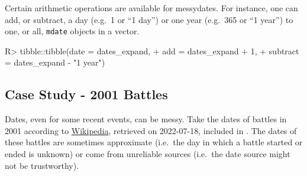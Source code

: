 \documentclass[
]{jss}
\begin{document}
Certain arithmetic operations are available for messydates. For
instance, one can add, or subtract, a day (e.g.~1 or ``1 day'') or one
year (e.g.~365 or ``1 year'') to one, or all, \texttt{mdate} objects in
a vector.

\begin{CodeChunk}
\begin{CodeInput}
R> tibble::tibble(date = dates_expand,
+                add = dates_expand + 1,
+                subtract = dates_expand - "1 year")
\end{CodeInput}
\begin{CodeOutput}
# A tibble: 4 x 3
  date                                add                                subtr~1
  <mdate>                             <mdate>                            <mdate>
1 2001-01                             2001-01-02..2001-02-01           ~ 2000-0~
2 2001-01-01..2001-01-12              2001-01-02..2001-01-13           ~ 2000-0~
3 {2001-01-01,2001-02-01..2001-02-03} {2001-01-02,2001-02-02..2001-02-0~ {2000-~
4 2001-XX-01                          2001-XX-02                       ~ 2000-X~
# ... with abbreviated variable name 1: subtract
\end{CodeOutput}
\end{CodeChunk}

\hypertarget{case-study---2001-battles}{%
\subsection{Case Study - 2001 Battles}\label{case-study---2001-battles}}

Dates, even for some recent events, can be messy. Take the dates of
battles in 2001 according to
\href{https://en.wikipedia.org/wiki/List_of_battles_in_the_21st_century}{Wikipedia},
retrieved on 2022-07-18, included in . The dates of
these battles are sometimes approximate (i.e.~the day in which a battle
started or ended is unknown) or come from unreliable sources (i.e.~the
date source might not be trustworthy).
\end{document}
